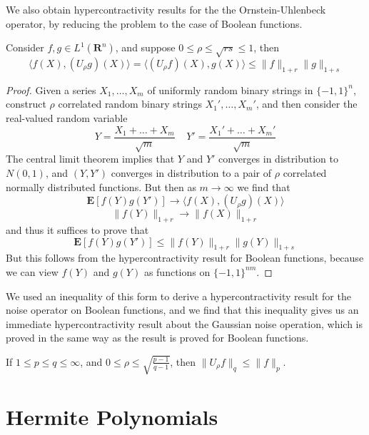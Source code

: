 We also obtain hypercontractivity results for the the Ornstein-Uhlenbeck operator, by reducing the problem to the case of Boolean functions.

\begin{theorem}
    Consider $f,g \in L^1(\mathbf{R}^n)$, and suppose $0 \leq \rho \leq \sqrt{rs} \leq 1$, then
    \[ \langle f(X), (U_\rho g)(X) \rangle = \langle (U_\rho f)(X), g(X) \rangle \leq \| f \|_{1 + r} \| g \|_{1 + s} \]
\end{theorem}
\begin{proof}
    Given a series $X_1, \dots, X_m$ of uniformly random binary strings in $\{ -1, 1 \}^n$, construct $\rho$ correlated random binary strings $X_1', \dots, X_m'$, and then consider the real-valued random variable
    \[ Y = \frac{X_1 + \dots + X_m}{\sqrt{m}}\ \ \ \ \ Y' = \frac{X_1' + \dots + X_m'}{\sqrt{m}} \]
    The central limit theorem implies that $Y$ and $Y'$ converges in distribution to $N(0,1)$, and $(Y,Y')$ converges in distribution to a pair of $\rho$ correlated normally distributed functions. But then as $m \to \infty$ we find that
    \[ \mathbf{E}[f(Y)g(Y')] \to \langle f(X), (U_\rho g)(X) \rangle \]
    \[ \| f(Y) \|_{1 + r} \to \| f(X) \|_{1 + r} \]
    and thus it suffices to prove that
    \[ \mathbf{E}[f(Y)g(Y')] \leq \| f(Y) \|_{1 + r} \| g(Y) \|_{1 + s} \]
    But this follows from the hypercontractivity result for Boolean functions, because we can view $f(Y)$ and $g(Y)$ as functions on $\{ -1, 1 \}^{nm}$.
\end{proof}

We used an inequality of this form to derive a hypercontractivity result for the noise operator on Boolean functions, and we find that this inequality gives us an immediate hypercontractivity result about the Gaussian noise operation, which is proved in the same way as the result is proved for Boolean functions.

\begin{corollary}
    If $1 \leq p \leq q \leq \infty$, and $0 \leq \rho \leq \sqrt{\frac{p-1}{q-1}}$, then $\| U_\rho f \|_q \leq \| f \|_p$.
\end{corollary}

\section{Hermite Polynomials}

